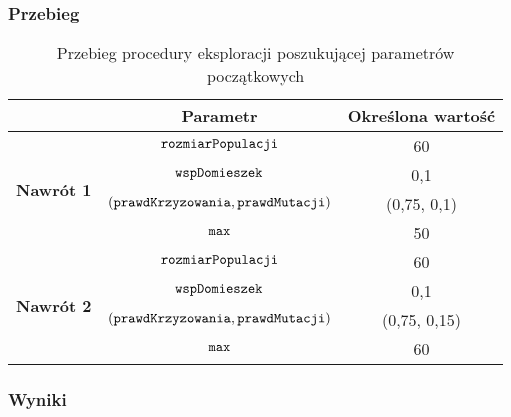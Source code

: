 \documentclass[./FM_mgr.tex]{subfiles}
\begin{document}
\subsubsection{Przebieg}


\begin{table}[H]
	\caption{Przebieg procedury eksploracji poszukującej parametrów początkowych \label{table:knapsack_tweak_flow}}
	\centering
	\begin{tabular}{c|c|c|}
		\cline{2-3}
		& {\bf Parametr}                                     & {\bf Określona wartość} \\ \hline
		\multicolumn{1}{|c|}{\multirow{4}{*}{{\bf Nawrót 1}}} & $\mathtt{rozmiarPopulacji}$                         & 60                      \\ \cline{2-3} 
		\multicolumn{1}{|c|}{}                                & $\mathtt{wspDomieszek}$                             & 0,1                     \\ \cline{2-3} 
		\multicolumn{1}{|c|}{}                                & $(\mathtt{prawdKrzyzowania}, \mathtt{prawdMutacji})$ & (0,75, 0,1)             \\ \cline{2-3} 
		\multicolumn{1}{|c|}{}                                & $\mathtt{max}$                                      & 50                     \\ \hline \hline
		\multicolumn{1}{|c|}{\multirow{4}{*}{{\bf Nawrót 2}}} & $\mathtt{rozmiarPopulacji}$                         & 60                      \\ \cline{2-3} 
		\multicolumn{1}{|c|}{}                                & $\mathtt{wspDomieszek}$                             & 0,1                     \\ \cline{2-3} 
		\multicolumn{1}{|c|}{}                                & $(\mathtt{prawdKrzyzowania}, \mathtt{prawdMutacji})$ & (0,75, 0,15)             \\ \cline{2-3} 
		\multicolumn{1}{|c|}{}                                & $\mathtt{max}$                                      & 60                     \\ \hline
	\end{tabular}
\end{table}	

\subsubsection{Wyniki}
\end{document}

